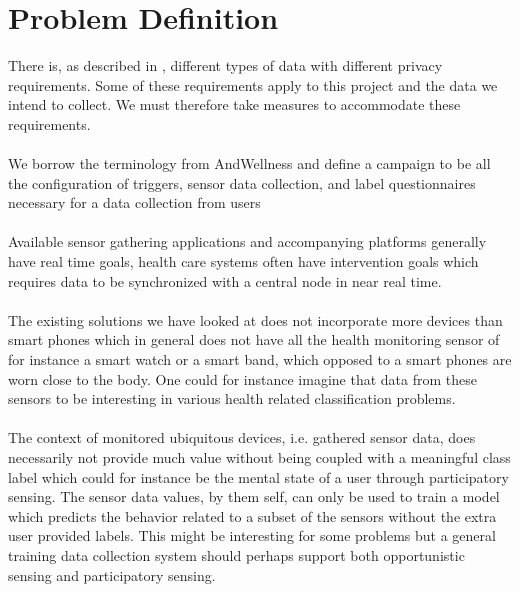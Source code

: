 
\section{Problem Definition} 
\label{sec:problem_definition}
There is, as described in , different types of data with different privacy requirements. Some of these requirements apply to this project and the data we intend to collect. We must therefore take measures to accommodate these requirements. 
\\\\
We borrow the terminology from AndWellness \parencite{hicks2010andwellness} and define a campaign to be all the configuration of triggers, sensor data collection, and label questionnaires necessary for a data collection from users    
\\\\
Available sensor gathering applications and accompanying platforms generally have real time goals, health care systems often have intervention goals which requires data to be synchronized with a central node in near real time. 
\\\\
The existing solutions we have looked at does not incorporate more devices than smart phones which in general does not have all the health monitoring sensor of for instance a smart watch or a smart band, which opposed to a smart phones are worn close to the body. One could for instance imagine that data from these sensors to be interesting in various health related classification problems. 
\\\\
The context of monitored ubiquitous devices, i.e. gathered sensor data, does necessarily not provide much value without being coupled with a meaningful class label which could for instance be the mental state of a user through participatory sensing. The sensor data values, by them self, can only be used to train a model which predicts the behavior related to a subset of the sensors without the extra user provided labels. This might be interesting for some problems but a general training data collection system should perhaps support both opportunistic sensing and participatory sensing. 

